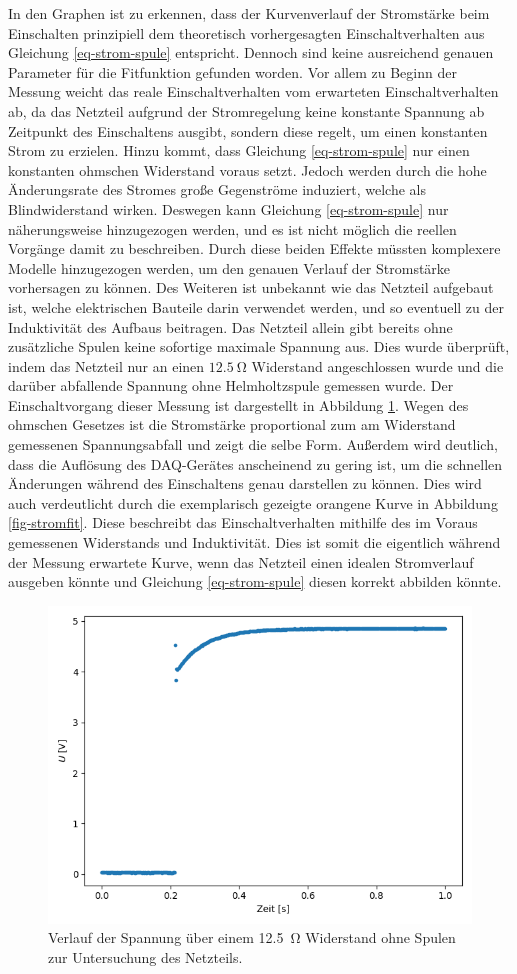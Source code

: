 \documentclass[page,pdftex,12pt,a4paper,twoside,openright]{scrbook}
\begin{document}
In den Graphen ist zu erkennen, dass der Kurvenverlauf der Stromstärke beim Einschalten prinzipiell dem theoretisch vorhergesagten Einschaltverhalten aus Gleichung \ref{eq-strom-spule} entspricht. Dennoch sind keine ausreichend genauen Parameter für die Fitfunktion gefunden worden. Vor allem zu Beginn der Messung weicht das reale Einschaltverhalten vom erwarteten Einschaltverhalten ab, da das Netzteil aufgrund der Stromregelung keine konstante Spannung ab Zeitpunkt des Einschaltens ausgibt, sondern diese regelt, um einen konstanten Strom zu erzielen. Hinzu kommt, dass Gleichung \ref{eq-strom-spule} nur einen konstanten ohmschen Widerstand voraus setzt. Jedoch werden durch die hohe Änderungsrate des Stromes große Gegenströme induziert, welche als Blindwiderstand wirken. Deswegen kann Gleichung \ref{eq-strom-spule} nur näherungsweise hinzugezogen werden, und es ist nicht möglich die reellen Vorgänge damit zu beschreiben. Durch diese beiden Effekte müssten komplexere Modelle hinzugezogen werden, um den genauen Verlauf der Stromstärke vorhersagen zu können. 
Des Weiteren ist unbekannt wie das Netzteil aufgebaut ist, welche elektrischen Bauteile darin verwendet werden, und so eventuell zu der Induktivität des Aufbaus beitragen. Das Netzteil allein gibt bereits ohne zusätzliche Spulen keine sofortige maximale Spannung aus. Dies wurde überprüft, indem das Netzteil nur an einen \(\SI{12.5}{\ohm}\) Widerstand angeschlossen wurde und die darüber abfallende Spannung ohne Helmholtzspule gemessen wurde. Der Einschaltvorgang dieser Messung ist dargestellt in Abbildung \ref{fig-12ohm}. Wegen des ohmschen Gesetzes ist die Stromstärke proportional zum am Widerstand gemessenen Spannungsabfall und zeigt die selbe Form. Außerdem wird deutlich, dass die Auflösung des DAQ-Gerätes anscheinend zu gering ist, um die schnellen Änderungen während des Einschaltens genau darstellen zu können.
Dies wird auch verdeutlicht durch die exemplarisch gezeigte orangene Kurve in Abbildung \ref{fig-stromfit}. Diese beschreibt das Einschaltverhalten mithilfe des im Voraus gemessenen Widerstands und Induktivität. Dies ist somit die eigentlich während der Messung erwartete Kurve, wenn das Netzteil einen idealen Stromverlauf ausgeben könnte und Gleichung \ref{eq-strom-spule} diesen korrekt abbilden könnte.

\begin{figure}[h]
\centering
\includegraphics[width=.5\textwidth]{img/12,5ohm.png}
\caption{\label{fig-12ohm}
Verlauf der Spannung über einem \SI{12.5}{\ohm} Widerstand ohne Spulen zur Untersuchung des Netzteils.}
\end{figure}
\end{document}
